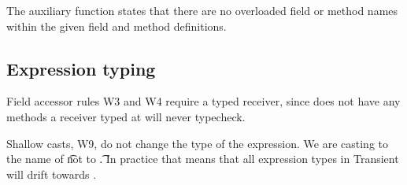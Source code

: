 \documentclass[a4paper,USenglish]{tex/lipics-v2016}
\begin{document}
The  auxiliary function states that there are no overloaded 
field or method names within the given field and method definitions. \\

\begin{mathpar}



\end{mathpar}

\begin{mathpar}
\end{mathpar}

\begin{mathpar}

\end{mathpar}

\subsection{Expression typing}

Field accessor rules W3 and W4 require a typed receiver, since \any does
not have any methods a receiver typed at \any will never typecheck.

Shallow casts, W9, do not change the type of the expression. We are casting
to the name of \t not to \t.  In practice that means that all expression
types in Transient will drift towards \any.

~\\
\end{document}
